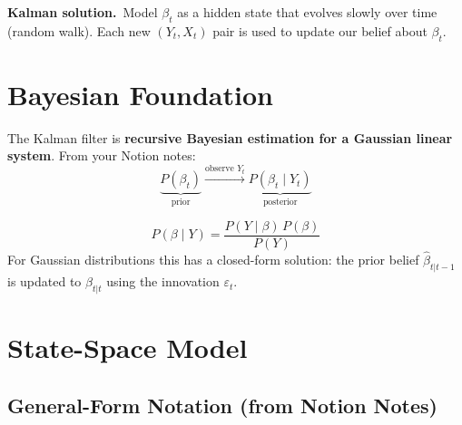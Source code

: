 \documentclass[10pt,a4paper,twocolumn]{article}
\begin{document}
\noindent\textbf{Kalman solution.}~Model $\beta_t$ as a hidden state that
evolves slowly over time (random walk).  Each new $(Y_t, X_t)$ pair is used
to update our belief about $\beta_t$.

\section{Bayesian Foundation}

The Kalman filter is \textbf{recursive Bayesian estimation for a Gaussian
linear system}.  From your Notion notes:
\[
  \underbrace{P(\beta_t)}_{\text{prior}}
  \xrightarrow{\text{observe }Y_t}
  \underbrace{P(\beta_t \mid Y_t)}_{\text{posterior}}
\]
\begin{tcolorbox}[mathbox={Bayes' Rule for Kalman}]
\vspace{-4pt}
\begin{equation}
  P(\beta \mid Y) = \frac{P(Y \mid \beta)\,P(\beta)}{P(Y)}
\end{equation}
\vspace{-4pt}
For Gaussian distributions this has a closed-form solution:
the prior belief $\hat\beta_{t|t-1}$ is updated to
$\hat\beta_{t|t}$ using the innovation $\varepsilon_t$.
\end{tcolorbox}

\section{State-Space Model}

\subsection{General-Form Notation (from Notion Notes)}
\end{document}
